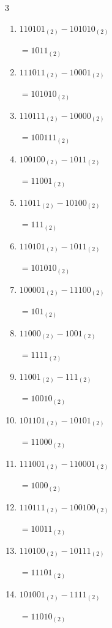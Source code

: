 \begin{multicols}{3}
\begin{enumerate}
  \item $110101_{(2)} - 101010_{(2)}$

        $=1011_{(2)}$

  \item $111011_{(2)} - 10001_{(2)}$

        $=101010_{(2)}$

  \item $110111_{(2)} - 10000_{(2)}$

        $=100111_{(2)}$

  \item $100100_{(2)} - 1011_{(2)}$

        $=11001_{(2)}$

\columnbreak %

  \item $11011_{(2)} - 10100_{(2)}$

        $=111_{(2)}$

  \item $110101_{(2)} - 1011_{(2)}$

        $=101010_{(2)}$

  \item $100001_{(2)} - 11100_{(2)}$

        $=101_{(2)}$

  \item $11000_{(2)} - 1001_{(2)}$

        $=1111_{(2)}$

  \item $11001_{(2)} - 111_{(2)}$

        $=10010_{(2)}$

  \item $101101_{(2)} - 10101_{(2)}$

        $=11000_{(2)}$

  \item $111001_{(2)} - 110001_{(2)}$

        $=1000_{(2)}$

  \item $110111_{(2)} - 100100_{(2)}$

        $=10011_{(2)}$

  \item $110100_{(2)} - 10111_{(2)}$

        $=11101_{(2)}$

  \item $101001_{(2)} - 1111_{(2)}$

        $=11010_{(2)}$

\columnbreak %


\end{enumerate}
\end{multicols}
